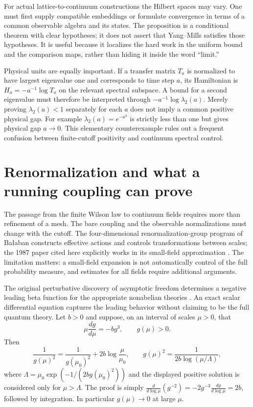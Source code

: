 For actual lattice-to-continuum constructions the Hilbert spaces may vary.
One must first supply compatible embeddings or formulate convergence in
terms of a common observable algebra and its states.  The proposition is
a conditional theorem with clear hypotheses; it does not assert that
Yang--Mills satisfies those hypotheses.  It is useful because it localizes
the hard work in the uniform bound and the comparison maps, rather than
hiding it inside the word ``limit.''

Physical units are equally important.  If a transfer matrix $T_a$ is
normalized to have largest eigenvalue one and corresponds to time step
$a$, its Hamiltonian is $H_a=-a^{-1}\log T_a$ on the relevant
spectral subspace.  A bound for a second eigenvalue must therefore be
interpreted through $-a^{-1}\log\lambda_2(a)$.  Merely proving
$\lambda_2(a)<1$ separately for each $a$ does not imply a common
positive physical gap.  For example
$\lambda_2(a)=e^{-a^2}$ is strictly less than one but gives physical
gap $a\to0$.  This elementary counterexample rules out a frequent
confusion between finite-cutoff positivity and continuum spectral control.

\section{Renormalization and what a running coupling can prove}

The passage from the finite Wilson law to continuum fields requires more
than refinement of a mesh.  The bare coupling and the observable
normalizations must change with the cutoff.  The four-dimensional
renormalization-group program of Ba{\l}aban constructs effective actions
and controls transformations between scales; the 1987 paper cited here
explicitly works in its small-field approximation
\cite{Balaban1987}.  The limitation matters: a small-field expansion is
not automatically control of the full probability measure, and estimates
for all fields require additional arguments.

The original perturbative discovery of asymptotic freedom determines a
negative leading beta function for the appropriate nonabelian theories
\cite{GrossWilczek1973}.  An exact scalar differential equation captures
the leading behavior without claiming to be the full quantum theory.
Let $b>0$ and suppose, on an interval of scales $\mu>0$, that
\begin{equation}
 \mu\frac{dg}{d\mu}=-b g^3,\qquad g(\mu)>0.
 \label{eq:one-loop-ode}
\end{equation}
Then
\begin{equation}
 \frac1{g(\mu)^2}
 =\frac1{g(\mu_0)^2}+2b\log\frac\mu{\mu_0},
 \qquad
 g(\mu)^2=\frac1{2b\log(\mu/\Lambda)},
 \label{eq:running-coupling-toy}
\end{equation}
where
$\Lambda=\mu_0\exp(-1/(2b g(\mu_0)^2))$ and the displayed positive
solution is considered only for $\mu>\Lambda$.  The proof is simply
$\frac{d}{d\log\mu}(g^{-2})=-2g^{-3}\frac{dg}{d\log\mu}=2b$,
followed by integration.  In particular $g(\mu)\to0$ at large
$\mu$.

